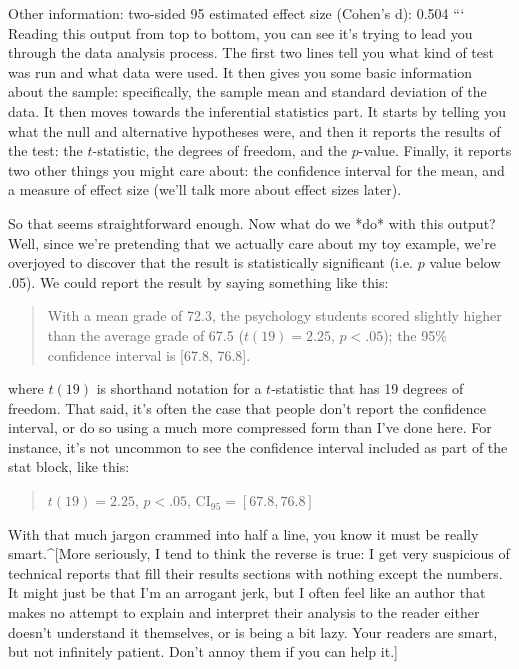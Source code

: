 Other information: 
   two-sided 95%
   estimated effect size (Cohen's d):  0.504 
```
Reading this output from top to bottom, you can see it's trying to lead you through the data analysis process. The first two lines tell you what kind of test was run and what data were used. It then gives you some basic information about the sample: specifically, the sample mean and standard deviation of the data. It then moves towards the inferential statistics part. It starts by telling you what the null and alternative hypotheses were, and then it reports the results of the test: the $t$-statistic, the degrees of freedom, and the $p$-value. Finally, it reports two other things you might care about: the confidence interval for the mean, and a measure of effect size (we'll talk more about effect sizes later). 

So that seems straightforward enough. Now what do we *do* with this output? Well, since we're pretending that we actually care about my toy example, we're overjoyed to discover that the result is statistically significant (i.e. $p$ value below .05). We could report the result by saying something like this:
\begin{quote}
With a mean grade of 72.3, the psychology students scored slightly higher than the average grade of 67.5 ($t(19) = 2.25$, $p<.05$); the 95\% confidence interval is [67.8, 76.8].
\end{quote}
where $t(19)$ is shorthand notation for a $t$-statistic that has 19 degrees of freedom. That said, it's often the case that people don't report the confidence interval, or do so using a much more compressed form than I've done here. For instance, it's not uncommon to see the confidence interval included as part of the stat block, like this:
\begin{quote}
$t(19) = 2.25$, $p<.05$, CI$_{95} = [67.8, 76.8]$
\end{quote}
With that much jargon crammed into half a line, you know it must be really smart.^[More seriously, I tend to think the reverse is true: I get very suspicious of technical reports that fill their results sections with nothing except the numbers. It might just be that I'm an arrogant jerk, but I often feel like an author that makes no attempt to explain and interpret their analysis to the reader either doesn't understand it themselves, or is being a bit lazy. Your readers are smart, but not infinitely patient. Don't annoy them if you can help it.]



